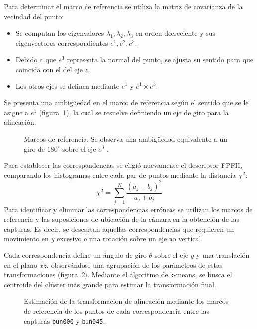 		Para determinar el marco de referencia se utiliza la matriz de covarianza de la vecindad del punto:
		\begin{itemize}
			\item Se computan los eigenvalores ${\lambda_1, \lambda_2, \lambda_3}$ en orden decreciente y sus eigenvectores correspondientes
				$e^{1}, e^{2}, e^{3}$.
			\item Debido a que $e^{3}$ representa la normal del punto, se ajusta su sentido para que coincida con el del eje $z$.
			\item Los otros ejes se definen mediante $e^{1}$ y $e^{1} \times e^{3}$.
		\end{itemize}
		Se presenta una ambigüedad en el marco de referencia según el sentido que se le asigne a $e^{1}$ (figura~\ref{fig:marco_referencia_iss}),
		la cual se resuelve definiendo un eje de giro para la alineación.

		\begin{figure}
			\caption[Marcos de referencia]{\label{fig:marco_referencia_iss}Marcos de referencia. Se observa una ambigüedad equivalente a un giro de $180^{\circ}$ sobre el eje $e^{3}$ .}
		\end{figure}

		Para establecer las correspondencias se eligió nuevamente el descriptor FPFH,
		comparando los histogramas entre cada par de puntos mediante la distancia $\chi^2$:
		\[ \chi^2 = \sum_{j=1}^{N} \frac{\left(a_j - b_j\right)^2}{a_j + b_j} \]
		Para identificar y eliminar las correspondencias erróneas se utilizan
		los marcos de referencia y las suposiciones de ubicación de la cámara
		en la obtención de las capturas.  Es decir, se descartan aquellas correspondencias que
		requieren un movimiento en $y$ excesivo o una rotación sobre un eje no
		vertical.

		Cada correspondencia define un ángulo de giro $\theta$ sobre
		el eje $y$ y una translación en el plano $xz$, observándose una agrupación
		de los parámetros de estas transformaciones (figura~\ref{fig:cluster}).
		Mediante el algoritmo de k-means, se busca el centroide del clúster más grande
		para estimar la transformación final.

		\begin{figure}
			\centering
			\begin{subfigure}{\linewidth}
				\centering
				\begin{tikzpicture}
					
				\end{tikzpicture}
			\end{subfigure}
			\begin{subfigure}{\linewidth}
				
			\end{subfigure}
				\caption[Estimación de la transformación de alineación mediante los marcos de referencia]{\label{fig:cluster}Estimación de la transformación de alineación
				mediante los marcos de referencia de los puntos de cada correspondencia
				entre las capturas \texttt{bun000} y \texttt{bun045}.}
		\end{figure}

